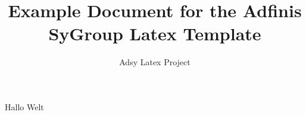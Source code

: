 \documentclass[oneside,DIV12,BCOR0.5cm]{adsyDoc}
\begin{document}
\title{Example Document for the Adfinis SyGroup Latex Template}

\subtitle{Adsy Latex Project}

\maketitle

Hallo Welt
\end{document}
